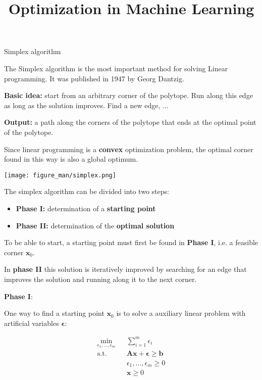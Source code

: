 \documentclass[11pt,compress,t,notes=noshow, xcolor=table]{beamer}
\title{Optimization in Machine Learning}
\date{}
\begin{document}
\lecture{\inserttitle}
\sloppy
\begin{vbframe}{Simplex algorithm}

The Simplex algorithm is the most important method for solving Linear programming. It was published in 1947 by Georg Dantzig.

\lz

\textbf{Basic idea:} start from an arbitrary corner of the polytope. Run along this edge as long as the solution improves. Find a new edge, ...

\lz

\textbf{Output:} a path along the corners of the polytope that ends at the optimal point of the polytope.

\lz

Since linear programming is a \textbf{convex} optimization problem, the optimal corner found in this way is also a global optimum.

\framebreak

\begin{center}
\texttt{[image: figure\_man/simplex.png]}
\end{center}

\framebreak

The simplex algorithm can be divided into two steps:

\begin{itemize}
\item \textbf{Phase I:} determination of a \textbf{starting point}
\item \textbf{Phase II:} determination of the \textbf{optimal solution}
\end{itemize}

To be able to start, a starting point must first be found in \textbf{Phase I}, i.e. a feasible corner $\bm{x}_0$.

\lz

In \textbf{phase II} this solution is iteratively improved by searching for an edge that improves the solution and running along it to the next corner.

\framebreak

\textbf{Phase I}:

One way to find a starting point $\bm{x}_0$ is to solve a auxiliary linear problem with artificial variables $\bm{\epsilon}$:

\begin{eqnarray*}
\min_{\epsilon_1, ..., \epsilon_m} && \sum_{i = 1}^m \epsilon_i \\
\text{s.t. } && \bm{Ax} + \bm{\epsilon} \ge \bm{b} \\
&& \epsilon_1, ..., \epsilon_m \ge 0\\
&& \bm{x} \ge 0
\end{eqnarray*}


\end{vbframe}
\end{document}
